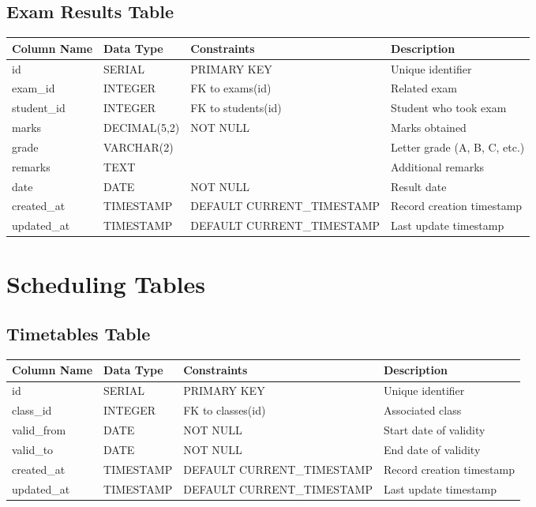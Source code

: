 \documentclass[11pt,a4paper]{article}
\begin{document}
\subsection{Exam Results Table}
\begin{longtable}{|p{3cm}|p{3cm}|p{2cm}|p{6cm}|}
\hline
\textbf{Column Name} & \textbf{Data Type} & \textbf{Constraints} & \textbf{Description} \\
\hline
\endhead
id & SERIAL & PRIMARY KEY & Unique identifier \\
\hline
exam\_id & INTEGER & FK to exams(id) & Related exam \\
\hline
student\_id & INTEGER & FK to students(id) & Student who took exam \\
\hline
marks & DECIMAL(5,2) & NOT NULL & Marks obtained \\
\hline
grade & VARCHAR(2) & & Letter grade (A, B, C, etc.) \\
\hline
remarks & TEXT & & Additional remarks \\
\hline
date & DATE & NOT NULL & Result date \\
\hline
created\_at & TIMESTAMP & DEFAULT CURRENT\_TIMESTAMP & Record creation timestamp \\
\hline
updated\_at & TIMESTAMP & DEFAULT CURRENT\_TIMESTAMP & Last update timestamp \\
\hline
\end{longtable}

\section{Scheduling Tables}

\subsection{Timetables Table}
\begin{longtable}{|p{3cm}|p{3cm}|p{2cm}|p{6cm}|}
\hline
\textbf{Column Name} & \textbf{Data Type} & \textbf{Constraints} & \textbf{Description} \\
\hline
\endhead
id & SERIAL & PRIMARY KEY & Unique identifier \\
\hline
class\_id & INTEGER & FK to classes(id) & Associated class \\
\hline
valid\_from & DATE & NOT NULL & Start date of validity \\
\hline
valid\_to & DATE & NOT NULL & End date of validity \\
\hline
created\_at & TIMESTAMP & DEFAULT CURRENT\_TIMESTAMP & Record creation timestamp \\
\hline
updated\_at & TIMESTAMP & DEFAULT CURRENT\_TIMESTAMP & Last update timestamp \\
\hline
\end{longtable}
\end{document}
